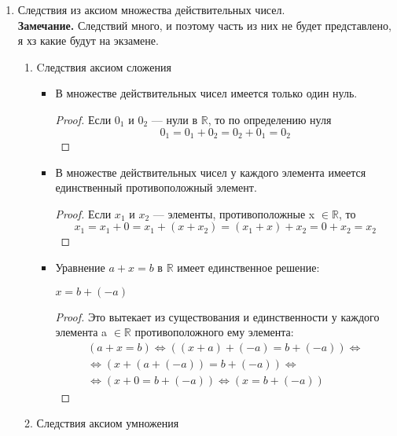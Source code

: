 \documentclass[a4paper,14pt]{extreport} %
\begin{document}
\begin{center}
\begin{enumerate}
		
		\item Следствия из аксиом множества действительных чисел.\\
		\textbf{Замечание.} Следствий много, и поэтому часть из них не будет представлено, я хз какие будут на экзамене.
		\begin{enumerate}
			\item Cледствия аксиом сложения
			\begin{itemize}
				\item В множестве действительных чисел имеется только один нуль.
				\begin{proof}
					Если $0_1$ и $0_2$ — нули в $\mathbb{R}$, то по определению нуля
					\begin{equation}
						0_1 = 0_1 + 0_2 = 0_2 + 0_1 = 0_2
					\end{equation}
				\end{proof}
				
				\item В множестве действительных чисел у каждого элемента имеется единственный противоположный элемент.
				\begin{proof}
					Если $x_1$ и $x_2$ — элементы, противоположные x $\in \mathbb{R}$, то
					\begin{equation}
						x_1 = x_1 + 0 = x_1 + (x+x_2) = (x_1+x) + x_2 = 0 + x_2 = x_2
					\end{equation}
				\end{proof}
				
				\item Уравнение $a + x = b$ в $\mathbb{R}$ имеет единственное решение:
				\begin{center}
					$x = b + (-a)$
				\end{center}
				\begin{proof}
					Это вытекает из существования и единственности у каждого элемента
					a $\in \mathbb{R}$ противоположного ему элемента:
					\begin{multline*}
						(a+x=b) \Leftrightarrow ((x+a)+(-a) = b + (-a)) \Leftrightarrow \\
						\Leftrightarrow (x+ (a + (-a)) = b+ (-a)) \Leftrightarrow \\
						\Leftrightarrow (x+0 = b+(-a)) \Leftrightarrow (x = b + (-a))
					\end{multline*}
				\end{proof}
			\end{itemize}
			
			\item Следствия аксиом умножения
			

\end{enumerate}
\end{enumerate}
\end{center}
\end{document}
